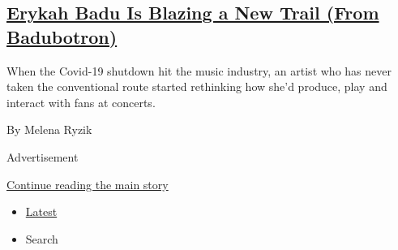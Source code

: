 \begin{enumerate}
  \hypertarget{erykah-badu-is-blazing-a-new-trail-from-badubotron}{%
  \subsection{\texorpdfstring{\href{/2020/07/21/arts/music/erykah-badu-livestreams.html}{Erykah
  Badu Is Blazing a New Trail (From
  Badubotron)}}{Erykah Badu Is Blazing a New Trail (From Badubotron)}}\label{erykah-badu-is-blazing-a-new-trail-from-badubotron}}

  When the Covid-19 shutdown hit the music industry, an artist who has
  never taken the conventional route started rethinking how she'd
  produce, play and interact with fans at concerts.

  By Melena Ryzik
\end{enumerate}

Advertisement

\protect\hyperlink{after-mid1}{Continue reading the main story}

\begin{itemize}
\tightlist
\item
  \protect\hyperlink{stream-panel}{Latest}
\item
  Search
\end{itemize}

